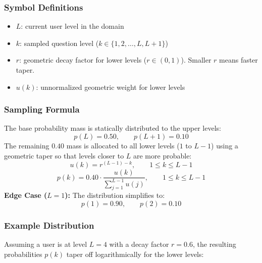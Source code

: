 \documentclass[11pt]{article}
\begin{document}
\subsubsection*{Symbol Definitions}
\begin{itemize}[leftmargin=*]
    \item $L$: current user level in the domain
    \item $k$: sampled question level ($k \in \{1,2,\dots,L,L+1\}$)
    \item $r$: geometric decay factor for lower levels ($r \in (0,1)$). Smaller $r$ means faster taper.
    \item $u(k)$: unnormalized geometric weight for lower levels
\end{itemize}

\subsubsection*{Sampling Formula}
The base probability mass is statically distributed to the upper levels:
\[
p(L)=0.50, \qquad p(L+1)=0.10
\]
The remaining $0.40$ mass is allocated to all lower levels ($1$ to $L-1$) using a geometric taper so that levels closer to $L$ are more probable:
\[
u(k)=r^{(L-1)-k}, \qquad 1 \le k \le L-1
\]
\[
p(k)=0.40\cdot\frac{u(k)}{\sum_{j=1}^{L-1} u(j)}, \qquad 1 \le k \le L-1
\]
\textbf{Edge Case ($L=1$):} The distribution simplifies to:
\[
p(1)=0.90, \qquad p(2)=0.10
\]

\subsubsection*{Example Distribution}
Assuming a user is at level $L=4$ with a decay factor $r=0.6$, the resulting probabilities $p(k)$ taper off logarithmically for the lower levels:

\begin{center}
\end{center}
\end{document}
